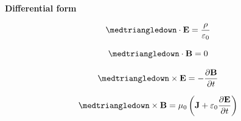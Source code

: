 \documentclass[10pt, letterpaper]{article}
\numberwithin{equation}{section}
\begin{document}
\begin{fleqn}
{\bf \large Differential form}

\begin{equation}
\medtriangledown \cdot {\bf E} = \frac{\rho}{\varepsilon_0}
\end{equation}

\begin{equation}
\medtriangledown \cdot {\bf B} = 0
\end{equation}

\begin{equation}
\medtriangledown \times {\bf E} = -\frac{\partial {\bf B}}{\partial t}
\end{equation}

\begin{equation}
\medtriangledown \times {\bf B} = \mu_0 \, \bigg( {\bf J} + \varepsilon_0 \frac{\partial {\bf E}}{\partial t} \bigg)
\end{equation} \newline
\end{fleqn} \newpage
\end{document}
